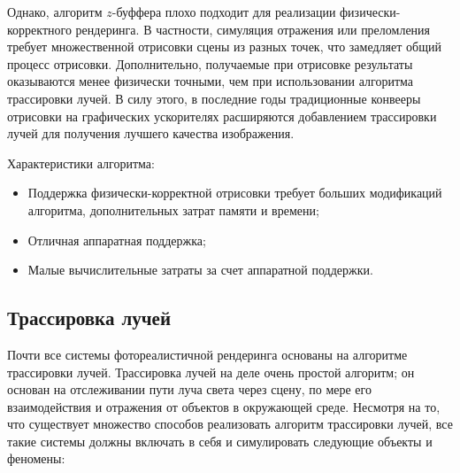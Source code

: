 Однако, алгоритм $z$-буффера плохо подходит для реализации физически-корректного рендеринга.
В частности, симуляция отражения или преломления требует множественной отрисовки сцены
из разных точек, что замедляет общий процесс отрисовки. Дополнительно, получаемые при отрисовке
результаты оказываются менее физически точными, чем при использовании алгоритма трассировки лучей. 
В силу этого, в последние годы традиционные конвееры отрисовки на графических ускорителях 
расширяются добавлением трассировки лучей для получения лучшего качества изображения.\cite{FoCG}

Характеристики алгоритма:
\begin{itemize}
    \item Поддержка физически-корректной отрисовки требует больших модификаций алгоритма,
        дополнительных затрат памяти и времени;
    \item Отличная аппаратная поддержка;
    \item Малые вычислительные затраты за счет аппаратной поддержки.
\end{itemize}

\subsection{Трассировка лучей}
Почти все системы фотореалистичной рендеринга основаны на алгоритме трассировки лучей. 
Трассировка лучей на деле очень простой алгоритм; он основан на отслеживании пути луча света 
через сцену, по мере его взаимодействия и отражения от объектов в окружающей среде.
Несмотря на то, что существует множество способов реализовать алгоритм трассировки лучей, 
все такие системы должны включать в себя и симулировать следующие объекты и феномены:

